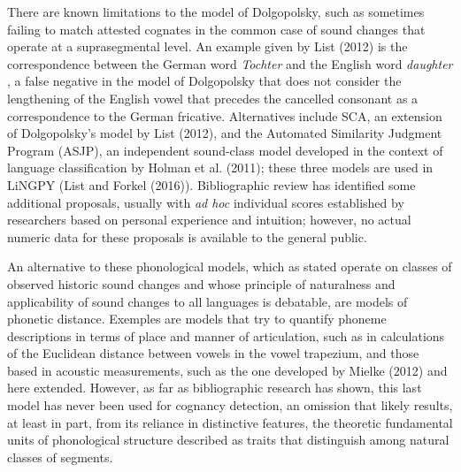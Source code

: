 \documentclass[a4paper]{article}
\begin{document}
There are known limitations to the model of Dolgopolsky, such as
sometimes failing to match attested cognates in the common case of sound
changes that operate at a suprasegmental level. An example given by List
(2012) is the correspondence between the German word \emph{Tochter}
\textipa{[tOxt@r]} and the English word \emph{daughter} \textipa{[dO:t@r]}, a false
negative in the model of Dolgopolsky that does not consider the
lengthening of the English vowel that precedes the cancelled consonant
as a correspondence to the German fricative. Alternatives include SCA,
an extension of Dolgopolsky's model by List (2012), and the Automated
Similarity Judgment Program (ASJP), an independent sound-class model
developed in the context of language classification by Holman et al.
(2011); these three models are used in LiNGPY (List and Forkel (2016)).
Bibliographic review has identified some additional proposals, usually
with \emph{ad hoc} individual scores established by researchers based on
personal experience and intuition; however, no actual numeric data for
these proposals is available to the general public.

An alternative to these phonological models, which as stated operate on
classes of observed historic sound changes and whose principle of
naturalness and applicability of sound changes to all languages is
debatable, are models of phonetic distance. Exemples are models that try
to quantify phoneme descriptions in terms of place and manner of
articulation, such as in calculations of the Euclidean distance between
vowels in the vowel trapezium, and those based in acoustic measurements,
such as the one developed by Mielke (2012) and here extended. However,
as far as bibliographic research has shown, this last model has never
been used for cognancy detection, an omission that likely results, at
least in part, from its reliance in distinctive features, the theoretic
fundamental units of phonological structure described as traits that
distinguish among natural classes of segments.
\end{document}
